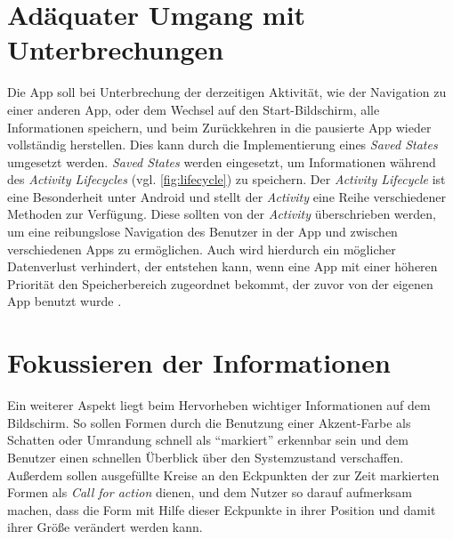 \section{Adäquater Umgang mit Unterbrechungen}
Die App soll bei Unterbrechung der derzeitigen Aktivität, wie der Navigation zu einer anderen App, oder dem Wechsel auf den Start-Bildschirm, alle Informationen speichern, und beim Zurückkehren in die pausierte App wieder vollständig herstellen.
Dies kann durch die Implementierung eines \emph{Saved States} umgesetzt werden.
\emph{Saved States} werden eingesetzt, um Informationen während des \emph{Activity Lifecycles} (vgl. \autoref{fig:lifecycle}) zu speichern.
Der \emph{Activity Lifecycle} ist eine Besonderheit unter Android und stellt der \emph{Activity} eine Reihe verschiedener Methoden zur Verfügung.
Diese sollten von der \emph{Activity} überschrieben werden, um eine reibungslose Navigation des Benutzer in der App und zwischen verschiedenen Apps zu ermöglichen.
Auch wird hierdurch ein möglicher Datenverlust verhindert, der entstehen kann, wenn eine App mit einer höheren Priorität den Speicherbereich zugeordnet bekommt, der zuvor von der eigenen App benutzt wurde \citep{alifecycle}.

\section{Fokussieren der Informationen}
Ein weiterer Aspekt liegt beim Hervorheben wichtiger Informationen auf dem Bildschirm.
So sollen Formen durch die Benutzung einer Akzent-Farbe als Schatten oder Umrandung schnell als ``markiert'' erkennbar sein und dem Benutzer einen schnellen Überblick über den Systemzustand verschaffen.
Außerdem sollen ausgefüllte Kreise an den Eckpunkten der zur Zeit markierten Formen als \emph{Call for action} dienen, und dem Nutzer so darauf aufmerksam machen, dass die Form mit Hilfe dieser Eckpunkte in ihrer Position und damit ihrer Größe verändert werden kann.

